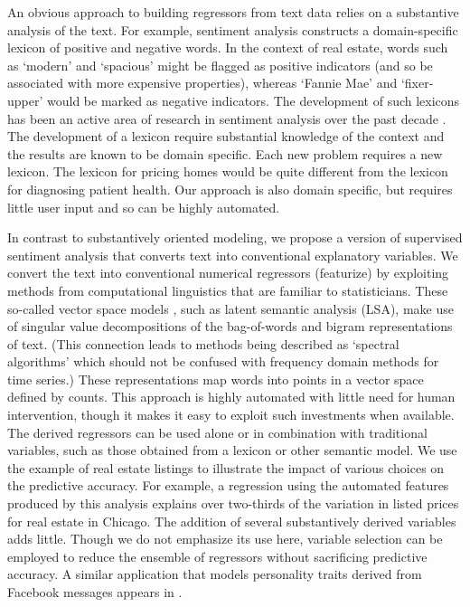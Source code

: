\documentclass[12pt]{article}
\begin{document}
 
 An obvious approach to building regressors from text data relies on a
 substantive analysis of the text.  For example, sentiment analysis constructs a
 domain-specific lexicon of positive and negative words.  In the context of real
 estate, words such as `modern' and `spacious' might be flagged as positive
 indicators (and so be associated with more expensive properties), whereas
 `Fannie Mae' and `fixer-upper' would be marked as negative indicators.  The
 development of such lexicons has been an active area of research in sentiment
 analysis over the past decade \citep{taboada11}.  The development of a lexicon
 require substantial knowledge of the context and the results are known to be
 domain specific.  Each new problem requires a new lexicon.  The lexicon for
 pricing homes would be quite different from the lexicon for diagnosing patient
 health.  Our approach is also domain specific, but requires little user input
 and so can be highly automated.


 In contrast to substantively oriented modeling, we propose a version of supervised
 sentiment analysis that converts text into conventional explanatory variables.
 We convert the text into conventional numerical regressors (featurize) by exploiting methods from computational linguistics that are familiar to statisticians. These so-called vector space models \citep{turney10}, such as latent semantic analysis (LSA), make use of  singular value decompositions of  the bag-of-words and bigram representations of text. (This connection leads to methods being described as `spectral algorithms' which should not be confused with frequency domain methods for time series.) These representations map words into points in a vector space defined by counts. This approach is highly automated with little need for human intervention, though it makes it easy to exploit such investments when available.  The derived regressors can be used alone or in combination with traditional variables, such as those obtained from a lexicon or other semantic model.  We use the example of real estate listings to illustrate the impact of various  choices on the predictive accuracy.  For example, a regression using the
 automated features produced by this analysis explains over two-thirds of the
 variation in listed prices for real estate in Chicago.  The addition of several
 substantively derived variables adds little.  Though we do not emphasize its
 use here, variable selection can be employed to reduce the ensemble of
 regressors without sacrificing predictive accuracy.  A similar application that models personality traits derived from Facebook messages appears in \citet{ungar13}.
\end{document}
